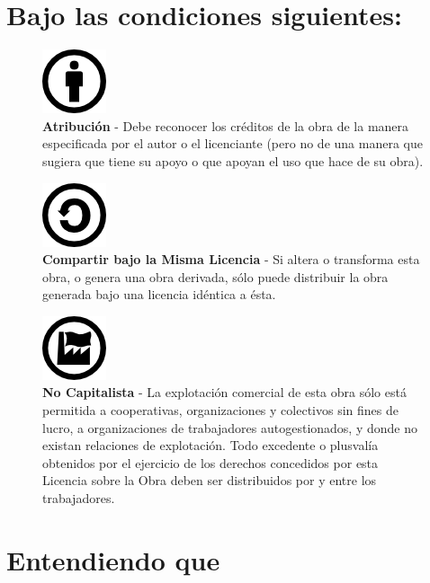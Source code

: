 \documentclass[
]{book}
\begin{document}
\hypertarget{bajo-las-condiciones-siguientes}{%
\section*{Bajo las condiciones siguientes:}\label{bajo-las-condiciones-siguientes}}

\begin{figure}
\centering
\includegraphics{images/by.png}
\caption{\textbf{Atribución} - Debe reconocer los créditos de la obra de la manera
especificada por el autor o el licenciante (pero no de una manera que sugiera
que tiene su apoyo o que apoyan el uso que hace de su obra).}
\end{figure}

\begin{figure}
\centering
\includegraphics{images/sa.png}
\caption{\textbf{Compartir bajo la Misma Licencia} - Si altera o transforma esta obra, o
genera una obra derivada, sólo puede distribuir la obra generada bajo una
licencia idéntica a ésta.}
\end{figure}

\begin{figure}
\centering
\includegraphics{images/nc.png}
\caption{\textbf{No Capitalista} - La explotación comercial de esta obra sólo está permitida
a cooperativas, organizaciones y colectivos sin fines de lucro, a
organizaciones de trabajadores autogestionados, y donde no existan relaciones
de explotación. Todo excedente o plusvalía obtenidos por el ejercicio de los
derechos concedidos por esta Licencia sobre la Obra deben ser distribuidos por y
entre los trabajadores.}
\end{figure}

\hypertarget{entendiendo-que}{%
\section*{Entendiendo que}\label{entendiendo-que}}
\end{document}
